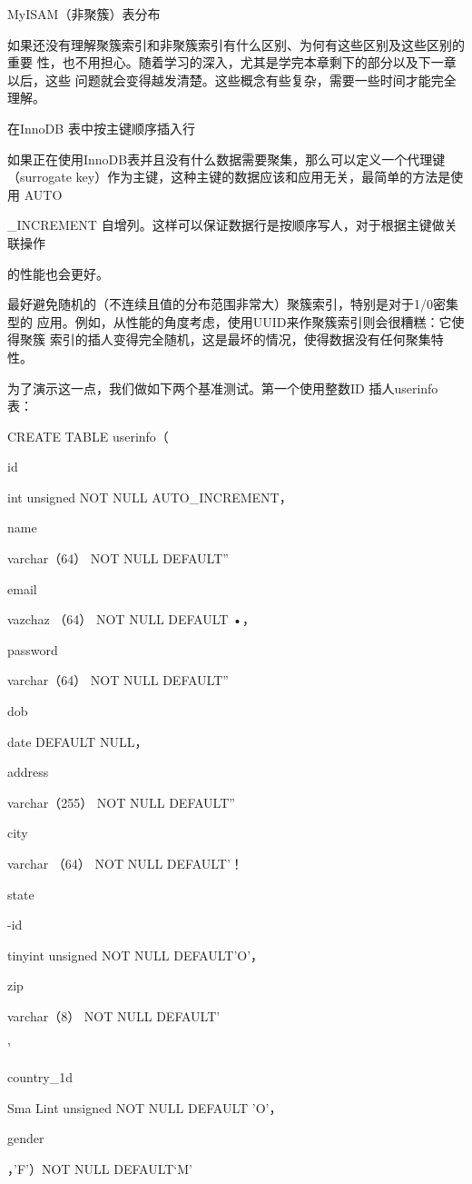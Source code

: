 MyISAM（非聚簇）表分布

如果还没有理解聚簇索引和非聚簇索引有什么区别、为何有这些区别及这些区别的重要
性，也不用担心。随着学习的深入，尤其是学完本章剩下的部分以及下一章以后，这些
问题就会变得越发清楚。这些概念有些复杂，需要一些时间才能完全理解。

在InnoDB 表中按主键顺序插入行

如果正在使用InnoDB表并且没有什么数据需要聚集，那么可以定义一个代理键
（surrogate key）作为主键，这种主键的数据应该和应用无关，最简单的方法是使用
AUTO

\_INCREMENT 自增列。这样可以保证数据行是按顺序写人，对于根据主键做关联操作

的性能也会更好。

最好避免随机的（不连续且值的分布范围非常大）聚簇索引，特别是对于1/0密集型的
应用。例如，从性能的角度考虑，使用UUID来作聚簇索引则会很糟糕：它使得聚簇
索引的插人变得完全随机，这是最坏的情况，使得数据没有任何聚集特性。

为了演示这一点，我们做如下两个基准测试。第一个使用整数ID 插人userinfo 表：

CREATE TABLE userinfo（

id

int unsigned NOT NULL AUTO\_INCREMENT，

name

varchar（64） NOT NULL DEFAULT''

email

vazchaz （64） NOT NULL DEFAULT •，

password

varchar（64） NOT NULL DEFAULT''

dob

date DEFAULT NULL，

address

varchar（255） NOT NULL DEFAULT''

city

varchar （64） NOT NULL DEFAULT'！

state

-id

tinyint unsigned NOT NULL DEFAULT'O’，

zip

varchar（8） NOT NULL DEFAULT'

’

country\_1d

Sma Lint unsigned NOT NULL DEFAULT 'O'，

gender

，'F'）NOT NULL DEFAULT‘M'

